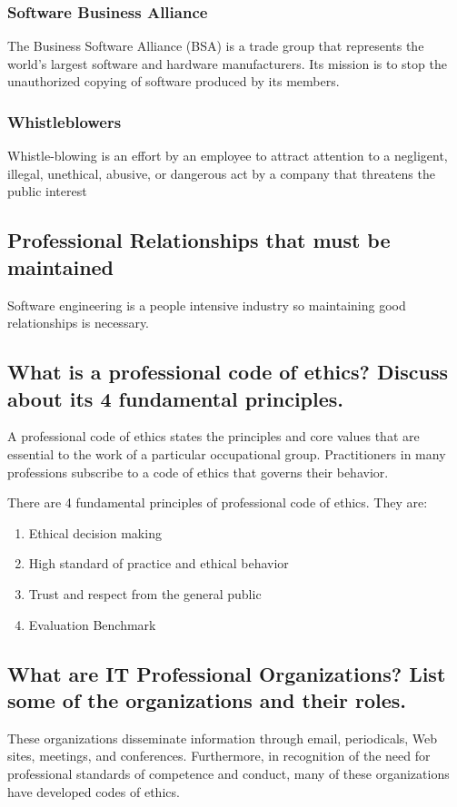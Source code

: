 \documentclass[11pt]{article}
\begin{document}
\subsubsection{Software Business Alliance}
\label{sec:orgfb49f85}
The Business Software Alliance (BSA) is a trade group that represents the world’s largest software and hardware manufacturers. Its mission is to stop the unauthorized copying of software produced by its members. 
\subsubsection{Whistleblowers}
\label{sec:org29fec19}
Whistle-blowing is an effort by an employee to attract attention to a negligent, illegal, unethical, abusive, or dangerous act by a company that threatens the public interest
\subsection{Professional Relationships that must be maintained}
\label{sec:org7bf161f}
Software engineering is a people intensive industry so maintaining good relationships is necessary.

\subsection{What is a professional code of ethics? Discuss about its 4 fundamental principles.}
\label{sec:orgebd9a61}
A professional code of ethics states the principles and core values that are essential to the work of a particular occupational group. Practitioners in many professions subscribe to a code of ethics that governs their behavior.

There are 4 fundamental principles of professional code of ethics. They are:
\begin{enumerate}
\item Ethical decision making
\item High standard of practice and ethical behavior
\item Trust and respect from the general public
\item Evaluation Benchmark
\end{enumerate}
\subsection{What are IT Professional Organizations? List some of the organizations and their roles.}
\label{sec:org5546d33}
These organizations disseminate information through email, periodicals, Web sites, meetings, and conferences. Furthermore, in recognition of the need for professional standards of competence and conduct, many of these organizations have developed codes of ethics.
\end{document}
